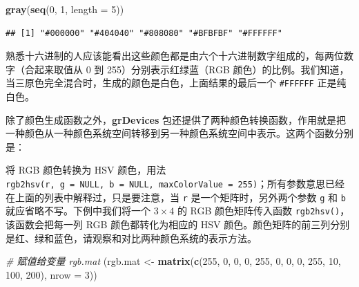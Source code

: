 \documentclass[
  b5paper,
  UTF8,twoside]{book}
\newenvironment{Shaded}{\begin{snugshade}}{\end{snugshade}}
\newcommand{\AttributeTok}[1]{\textcolor[rgb]{0.13,0.29,0.53}{#1}}
\newcommand{\CommentTok}[1]{\textcolor[rgb]{0.56,0.35,0.01}{\textit{#1}}}
\newcommand{\DecValTok}[1]{\textcolor[rgb]{0.00,0.00,0.81}{#1}}
\newcommand{\FunctionTok}[1]{\textcolor[rgb]{0.13,0.29,0.53}{\textbf{#1}}}
\newcommand{\NormalTok}[1]{#1}
\newcommand{\OtherTok}[1]{\textcolor[rgb]{0.56,0.35,0.01}{#1}}
\providecommand{\tightlist}{%
  \setlength{\itemsep}{0pt}\setlength{\parskip}{0pt}}
\begin{document}
\begin{Shaded}
\begin{Highlighting}[]
\FunctionTok{gray}\NormalTok{(}\FunctionTok{seq}\NormalTok{(}\DecValTok{0}\NormalTok{, }\DecValTok{1}\NormalTok{, }\AttributeTok{length =} \DecValTok{5}\NormalTok{))}
\end{Highlighting}
\end{Shaded}

\begin{verbatim}
## [1] "#000000" "#404040" "#808080" "#BFBFBF" "#FFFFFF"
\end{verbatim}

熟悉十六进制的人应该能看出这些颜色都是由六个十六进制数字组成的，每两位数字（合起来取值从 0 到 255）分别表示红绿蓝（RGB 颜色）的比例。我们知道，当三原色完全混合时，生成的颜色是白色，上面结果的最后一个 \texttt{\textquotesingle{}\#FFFFFF\textquotesingle{}} 正是纯白色。

除了颜色生成函数之外，\textbf{grDevices} 包还提供了两种颜色转换函数，作用就是把一种颜色从一种颜色系统空间转移到另一种颜色系统空间中表示。这两个函数分别是：

\begin{description}
\tightlist
\item[\texttt{rgb2hsv()}]
将 RGB 颜色转换为 HSV 颜色，用法 \texttt{rgb2hsv(r,\ g\ =\ NULL,\ b\ =\ NULL,\ maxColorValue\ =\ 255)}；所有参数意思已经在上面的列表中解释过，只是要注意，当 \texttt{r} 是一个矩阵时，另外两个参数 \texttt{g} 和 \texttt{b} 就应省略不写。下例中我们将一个 \(3\times4\) 的 RGB 颜色矩阵传入函数 \texttt{rgb2hsv()}，该函数会把每一列 RGB 颜色都转化为相应的 HSV 颜色。颜色矩阵的前三列分别是红、绿和蓝色，请观察和对比两种颜色系统的表示方法。
\end{description}

\begin{Shaded}
\begin{Highlighting}[]
\CommentTok{\# 赋值给变量 rgb.mat}
\NormalTok{(rgb.mat }\OtherTok{\textless{}{-}} \FunctionTok{matrix}\NormalTok{(}\FunctionTok{c}\NormalTok{(}\DecValTok{255}\NormalTok{, }\DecValTok{0}\NormalTok{, }\DecValTok{0}\NormalTok{, }\DecValTok{0}\NormalTok{, }\DecValTok{255}\NormalTok{, }\DecValTok{0}\NormalTok{, }\DecValTok{0}\NormalTok{, }\DecValTok{0}\NormalTok{, }\DecValTok{255}\NormalTok{, }\DecValTok{10}\NormalTok{, }\DecValTok{100}\NormalTok{, }\DecValTok{200}\NormalTok{), }\AttributeTok{nrow =} \DecValTok{3}\NormalTok{))}
\end{Highlighting}
\end{Shaded}
\end{document}

